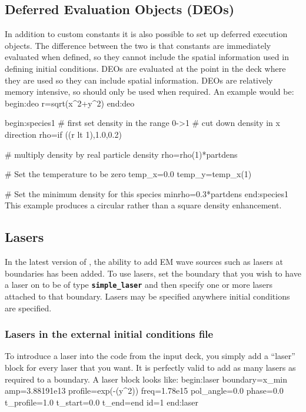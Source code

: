 \documentclass[12pt,a4paper]{article}
\newcommand{\inlinecode}[1]{{\color{warwickred} \bf\texttt{#1}}}
\newcommand{\EPOCH}{{\color{warwickdark}\fontfamily{phv}\selectfont{EPOCH}}}
\newenvironment{boxverbatim}{\lboxverbatim{none}}{\endlboxverbatim}
\begin{document}
\subsection{Deferred Evaluation Objects (DEOs)}
In addition to custom constants it is also possible to set up deferred
execution objects. The difference between the two is that constants are
immediately evaluated when defined, so they cannot include the spatial
information used in defining initial conditions. DEOs are evaluated at the
point in the deck where they are used so they can include spatial
information. DEOs are relatively memory intensive, so should only be used when
required. An example would be:
\begin{boxverbatim}
begin:deo
   r=sqrt(x^2+y^2)
end:deo

begin:species1
   # first set density in the range 0->1
   # cut down density in x direction
   rho=if ((r lt 1),1.0,0.2)

   # multiply density by real particle density
   rho=rho(1)*partdens

   # Set the temperature to be zero
   temp_x=0.0
   temp_y=temp_x(1)

   # Set the minimum density for this species
   minrho=0.3*partdens
end:species1
\end{boxverbatim}
This example produces a circular rather than a square density enhancement.

\subsection{Lasers}
In the latest version of {\EPOCH}, the ability to add EM wave sources such as
lasers at boundaries has been added. To use lasers, set the boundary that you
wish to have a laser on to be of type \inlinecode{simple\_laser} and then
specify one or more lasers attached to that boundary. Lasers may be specified
anywhere initial conditions are specified.

\subsubsection{Lasers in the external initial conditions file}
To introduce a laser into the code from the input deck, you simply add a
``laser'' block for every laser that you want. It is perfectly valid to add as
many lasers as required to a boundary. A laser block looks like:
\begin{boxverbatim}
begin:laser
   boundary=x_min
   amp=3.88191e13
   profile=exp(-(y^2))
   freq=1.78e15
   pol_angle=0.0
   phase=0.0
   t_profile=1.0
   t_start=0.0
   t_end=end
   id=1
end:laser
\end{boxverbatim}
\end{document}
